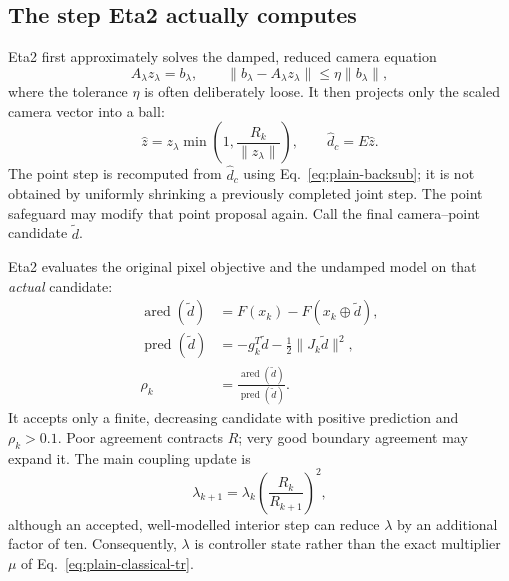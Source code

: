 \documentclass[11pt]{article}
\begin{document}
\subsection{The step Eta2 actually computes}

Eta2 first approximately solves the damped, reduced camera equation
\begin{equation}
  A_\lambda z_\lambda=b_\lambda,
  \qquad
  \lVert b_\lambda-A_\lambda z_\lambda\rVert
  \le \eta\lVert b_\lambda\rVert, \label{eq:plain-inexact-system}
\end{equation}
where the tolerance $\eta$ is often deliberately loose.  It then projects only the scaled camera vector into a ball:
\begin{equation}
  \widehat z
  =z_\lambda\min\!\left(1,\frac{R_k}{\lVert z_\lambda\rVert}\right),
  \qquad \widehat d_c=E\widehat z. \label{eq:plain-implemented-clip}
\end{equation}
The point step is recomputed from $\widehat d_c$ using Eq.~\eqref{eq:plain-backsub}; it is not obtained by uniformly shrinking a previously completed joint step.  The point safeguard may modify that point proposal again.  Call the final camera--point candidate $\widetilde d$.

Eta2 evaluates the original pixel objective and the undamped model on that \emph{actual} candidate:
\begin{align}
  \operatorname{ared}(\widetilde d)
    &=F(x_k)-F(x_k\oplus\widetilde d),\\
  \operatorname{pred}(\widetilde d)
    &=-g_k^T\widetilde d-\frac12\lVert J_k\widetilde d\rVert^2,\\
  \rho_k&=\frac{\operatorname{ared}(\widetilde d)}
                  {\operatorname{pred}(\widetilde d)}. \label{eq:plain-implemented-rho}
\end{align}
It accepts only a finite, decreasing candidate with positive prediction and $\rho_k>0.1$.  Poor agreement contracts $R$; very good boundary agreement may expand it.  The main coupling update is
\begin{equation}
  \lambda_{k+1}=\lambda_k\left(\frac{R_k}{R_{k+1}}\right)^2, \label{eq:plain-lambda-radius}
\end{equation}
although an accepted, well-modelled interior step can reduce $\lambda$ by an additional factor of ten.  Consequently, $\lambda$ is controller state rather than the exact multiplier $\mu$ of Eq.~\eqref{eq:plain-classical-tr}.
\end{document}
